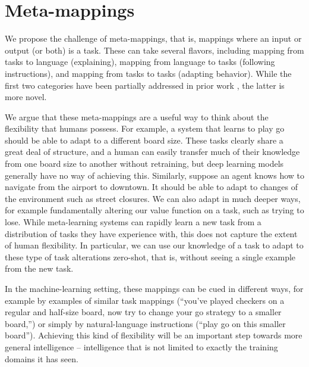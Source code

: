 \documentclass{article}
\begin{document}
\section{Meta-mappings}
We propose the challenge of meta-mappings, that is, mappings where an input or output (or both) is a task. These can take several flavors, including mapping from tasks to language (explaining), mapping from language to tasks (following instructions), and mapping from tasks to tasks (adapting behavior). While the first two categories have been partially addressed in prior work \citep[e.g.][]{Hermann2017, Co-Reyes2019}, the latter is more novel. \par
We argue that these meta-mappings are a useful way to think about the flexibility that humans possess. For example, a system that learns to play go should be able to adapt to a different board size. These tasks clearly share a great deal of structure, and a human can easily transfer much of their knowledge from one board size to another without retraining, but deep learning models generally have no way of achieving this. Similarly, suppose an agent knows how to navigate from the airport to downtown. It should be able to adapt to changes of the environment such as street closures. We can also adapt in much deeper ways, for example fundamentally altering our value function on a task, such as trying to lose. While meta-learning systems can rapidly learn a new task from a distribution of tasks they have experience with, this does not capture the extent of human flexibility. In particular, we can use our knowledge of a task to adapt to these type of task alterations zero-shot, that is, without seeing a single example from the new task. \par
In the machine-learning setting, these mappings can be cued in different ways, for example by examples of similar task mappings (``you've played checkers on a regular and half-size board, now try to change your go strategy to a smaller board,'') or simply by natural-language instructions (``play go on this smaller board''). Achieving this kind of flexibility will be an important step towards more general intelligence -- intelligence that is not limited to exactly the training domains it has seen. \par 
\end{document}
